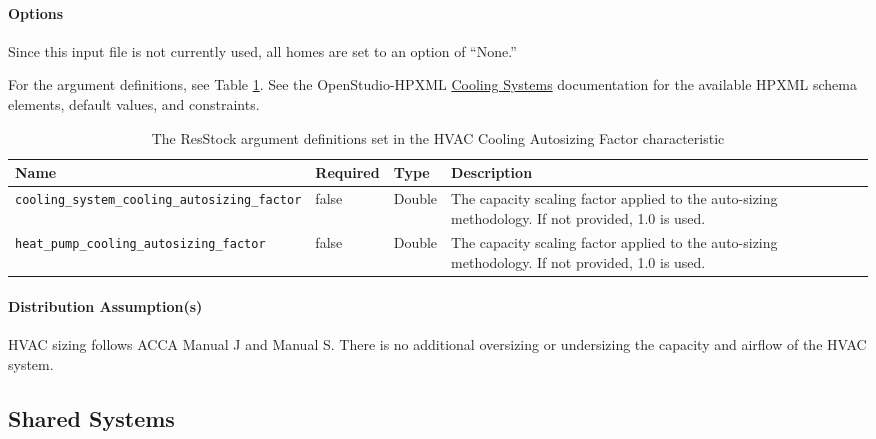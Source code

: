 \paragraph{Options}
Since this input file is not currently used, all homes are set to an option of ``None.''

For the argument definitions, see Table \ref{table:hc_arg_def_hvac_cool_auto}. See the OpenStudio-HPXML \href{https://openstudio-hpxml.readthedocs.io/en/v1.8.1/workflow_inputs.html#hpxml-cooling-systems}{Cooling Systems} documentation for the available HPXML schema elements, default values, and constraints.

\begin{longtable}[]{|p{4cm}|p{2cm}|p{2cm}|p{4cm}|} \caption{The ResStock argument definitions set in the HVAC Cooling Autosizing Factor characteristic} \label{table:hc_arg_def_hvac_cool_auto}\\
\toprule\noalign{}
Name & Required & Type &  Description \\
\midrule\noalign{}
\endhead
\bottomrule\noalign{}
\endlastfoot
\texttt{cooling\_system\_cooling\_autosizing\_factor} & false &  Double
&  The capacity scaling factor applied to the auto-sizing methodology.
If not provided, 1.0 is used. \\
\hline
\texttt{heat\_pump\_cooling\_autosizing\_factor} & false &  Double & 
The capacity scaling factor applied to the auto-sizing methodology. If
not provided, 1.0 is used. \\
\end{longtable}
\paragraph{Distribution Assumption(s)}
HVAC sizing follows ACCA Manual J and Manual S. There is no additional oversizing or undersizing the capacity and airflow of the HVAC system. 

\subsection{Shared Systems} \label{sec:shared_systems}
